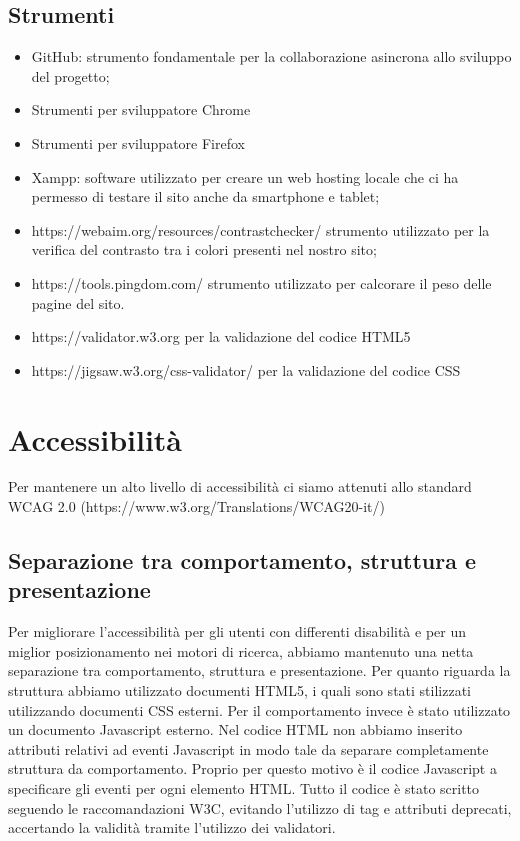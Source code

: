 \documentclass[a4paper]{article}
\begin{document}
	\subsection{Strumenti}
	\begin{itemize}
		\item GitHub: strumento fondamentale per la collaborazione asincrona allo sviluppo del progetto;
		\item Strumenti per sviluppatore Chrome
		\item Strumenti per sviluppatore Firefox
		\item Xampp: software utilizzato per creare un web hosting locale che ci ha permesso di testare il sito anche da smartphone e tablet;
		\item https://webaim.org/resources/contrastchecker/ strumento utilizzato per la verifica del contrasto tra i colori presenti nel nostro sito;
		\item https://tools.pingdom.com/ strumento utilizzato per calcorare il peso delle pagine del sito.
		\item https://validator.w3.org per la validazione del codice HTML5
		\item https://jigsaw.w3.org/css-validator/ per la validazione del codice CSS
	\end{itemize}

	\section{Accessibilità}
	Per mantenere un alto livello di accessibilità ci siamo attenuti allo standard WCAG 2.0 (https://www.w3.org/Translations/WCAG20-it/)

	\subsection{Separazione tra comportamento, struttura e presentazione}
	Per migliorare l'accessibilità per gli utenti con differenti disabilità e per un miglior posizionamento nei motori di ricerca, abbiamo mantenuto una netta separazione tra comportamento, struttura e presentazione.
	Per quanto riguarda la struttura abbiamo utilizzato documenti HTML5, i quali sono stati stilizzati utilizzando documenti CSS esterni. Per il comportamento invece è stato utilizzato un documento Javascript esterno.
	Nel codice HTML non abbiamo inserito attributi relativi ad eventi Javascript in modo tale da separare completamente struttura da comportamento. Proprio per questo motivo è il codice Javascript a specificare gli eventi per ogni elemento HTML.
	Tutto il codice è stato scritto seguendo le raccomandazioni W3C, evitando l'utilizzo di tag e attributi deprecati, accertando la validità tramite l'utilizzo dei validatori.
\end{document}
